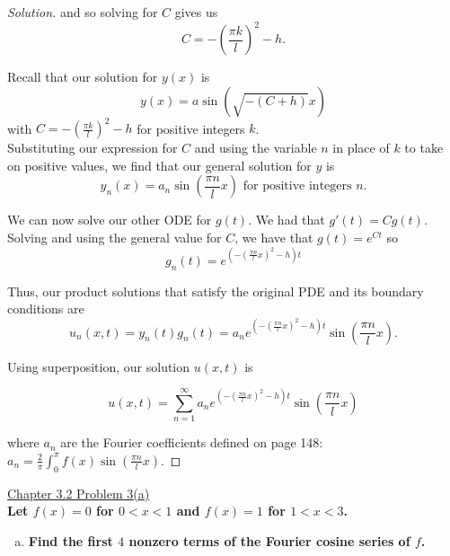 \documentclass[11pt]{article}
\newenvironment{solution}
  {\renewcommand\qedsymbol{$\blacksquare$}\begin{proof}[Solution]}
  {\end{proof}}
\begin{document}
\begin{solution}
and so solving for $C$ gives us \[C = -\left( \frac{\pi k}{l} \right)^2 - h.\]

Recall that our solution for $y(x)$ is \[y(x) =  a\sin\left(\sqrt{-(C+h)}x\right)\]
with $C = -\left( \frac{\pi k}{l} \right)^2 - h$ for positive integers $k$. \\

Substituting our expression for $C$ and using the variable $n$ in place of $k$ to take on positive values, we find that our general solution for $y$ is 
\[ y_n(x) = a_n \sin\left(\frac{\pi n}{l}x\right) \text { for positive integers } n.\]

We can now solve our other ODE for $g(t)$. We had that $g'(t) = Cg(t)$. Solving and using the general value for $C$, we have that $g(t) = e^{Ct}$ so 
\[ g_n(t) = e^{\left( -\left(\frac{\pi n}{l}x\right)^2 - h\right)t}\]

Thus, our product solutions that satisfy the original PDE and its boundary conditions are 
\[ u_n(x, t) = y_n(t) g_n(t) = a_ne^{\left( -\left(\frac{\pi n}{l}x\right)^2 - h\right)t} \sin\left(\frac{\pi n}{l} x\right). \]

Using superposition, our solution $u(x, t)$ is 

\[ \boxed{u(x, t) = \sum\limits_{n=1}^{\infty} a_ne^{\left( -\left(\frac{\pi n}{l}x\right)^2 - h\right)t} \sin\left(\frac{\pi n}{l} x\right)}\]

where $a_n$ are the Fourier coefficients defined on page 148: $a_n = \frac{2}{\pi}\int_0^\pi f(x) \sin\left(\frac{\pi n}{l} x \right).$

\end{solution}
\newpage

\underline{Chapter 3.2 Problem 3(a)} \\

\textbf{Let $f(x)=0$ for $0<x<1$ and $f(x)=1$ for $1<x<3$.}
\begin{enumerate}[a)] 
    \item \textbf{Find the first $4$ nonzero terms of the Fourier cosine series of $f$.}
  
\end{enumerate}
\end{document}
